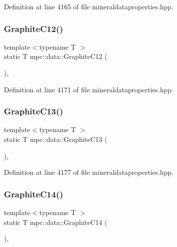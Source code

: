 Definition at line 4165 of file mineraldataproperties.\+hpp.

\mbox{\label{namespacempc_1_1data_a68fccf70e7512250766f422d5fc9c567}} 
\subsubsection{\texorpdfstring{Graphite\+C12()}{GraphiteC12()}}
{\footnotesize\ttfamily template$<$typename T $>$ \\
static T mpc\+::data\+::\+Graphite\+C12 (\begin{DoxyParamCaption}{ }\end{DoxyParamCaption})\hspace{0.3cm}{\ttfamily [inline]}, {\ttfamily [static]}}



Definition at line 4171 of file mineraldataproperties.\+hpp.

\mbox{\label{namespacempc_1_1data_a17e2bef640bc383044ccaab834f00032}} 
\subsubsection{\texorpdfstring{Graphite\+C13()}{GraphiteC13()}}
{\footnotesize\ttfamily template$<$typename T $>$ \\
static T mpc\+::data\+::\+Graphite\+C13 (\begin{DoxyParamCaption}{ }\end{DoxyParamCaption})\hspace{0.3cm}{\ttfamily [inline]}, {\ttfamily [static]}}



Definition at line 4177 of file mineraldataproperties.\+hpp.

\mbox{\label{namespacempc_1_1data_ac7e0ec47ff13536fcd4a0ff3e8ed5a74}} 
\subsubsection{\texorpdfstring{Graphite\+C14()}{GraphiteC14()}}
{\footnotesize\ttfamily template$<$typename T $>$ \\
static T mpc\+::data\+::\+Graphite\+C14 (\begin{DoxyParamCaption}{ }\end{DoxyParamCaption})\hspace{0.3cm}{\ttfamily [inline]}, {\ttfamily [static]}}



